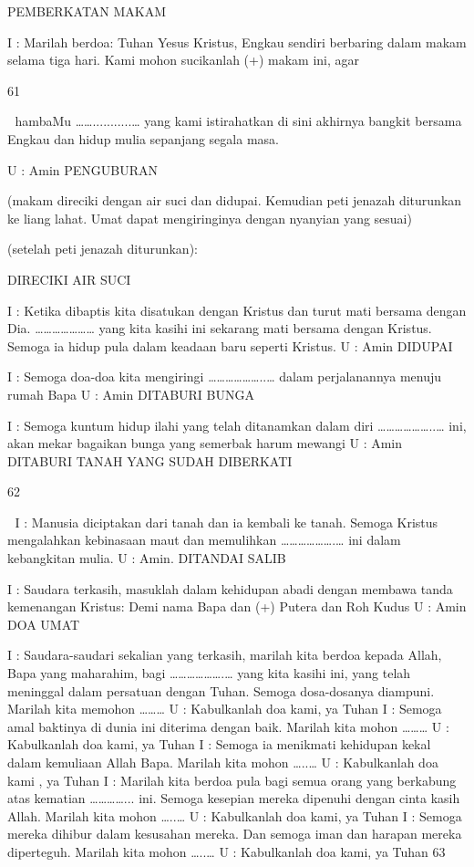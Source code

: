 PEMBERKATAN MAKAM 

I : Marilah berdoa: 
Tuhan Yesus Kristus, Engkau sendiri berbaring dalam makam 
selama tiga hari. Kami mohon sucikanlah (+) makam ini, agar 

61 



hambaMu ……...........… yang kami istirahatkan di sini akhirnya 
bangkit bersama Engkau dan hidup mulia sepanjang segala masa. 

U : Amin 
PENGUBURAN 

(makam direciki dengan air suci dan didupai. Kemudian peti jenazah 
diturunkan ke liang lahat. Umat dapat mengiringinya dengan 
nyanyian yang sesuai) 

(setelah peti jenazah diturunkan): 

DIRECIKI AIR SUCI 

I : Ketika dibaptis kita disatukan dengan Kristus dan turut mati 
bersama dengan Dia. ………………… yang kita kasihi ini sekarang 
mati bersama dengan Kristus. Semoga ia hidup pula dalam keadaan 
baru seperti Kristus. 
U : Amin 
DIDUPAI 

I : Semoga doa-doa kita mengiringi ………………..… dalam 
perjalanannya menuju rumah Bapa 
U : Amin 
DITABURI BUNGA 

I : Semoga kuntum hidup ilahi yang telah ditanamkan dalam diri 
………………..… ini, akan mekar bagaikan bunga yang semerbak 
harum mewangi 
U : Amin 
DITABURI TANAH YANG SUDAH DIBERKATI 

62 



I : Manusia diciptakan dari tanah dan ia kembali ke tanah. Semoga 
Kristus mengalahkan kebinasaan maut dan memulihkan 
……………….… ini dalam kebangkitan mulia. 
U : Amin. 
DITANDAI SALIB 

I : Saudara terkasih, masuklah dalam kehidupan abadi dengan 
membawa tanda kemenangan Kristus: Demi nama Bapa dan (+) 
Putera dan Roh Kudus 
U : Amin 
DOA UMAT 

I : Saudara-saudari sekalian yang terkasih, marilah kita berdoa 
kepada Allah, Bapa yang maharahim, bagi ……………….… yang 
kita kasihi ini, yang telah meninggal dalam persatuan dengan Tuhan. 
Semoga dosa-dosanya diampuni. Marilah kita memohon ……… 
U : Kabulkanlah doa kami, ya Tuhan 
I : Semoga amal baktinya di dunia ini diterima dengan baik. Marilah 
kita mohon ……… 
U : Kabulkanlah doa kami, ya Tuhan 
I : Semoga ia menikmati kehidupan kekal dalam kemuliaan Allah 
Bapa. Marilah kita mohon …..… 
U : Kabulkanlah doa kami , ya Tuhan 
I : Marilah kita berdoa pula bagi semua orang yang berkabung atas 
kematian …………... ini. Semoga kesepian mereka dipenuhi dengan 
cinta kasih Allah. Marilah kita mohon …..… 
U : Kabulkanlah doa kami, ya Tuhan 
I : Semoga mereka dihibur dalam kesusahan mereka. Dan semoga 
iman dan harapan mereka diperteguh. Marilah kita mohon …..… 
U : Kabulkanlah doa kami, ya Tuhan 
63 


